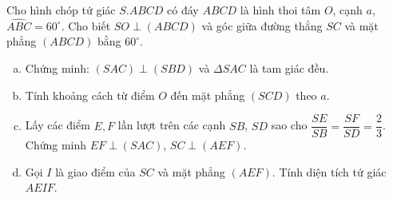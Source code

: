 \begin{bt}%
	Cho hình chóp tứ giác $S.ABCD$ có đáy $ABCD$ là hình thoi tâm $O$, cạnh $a$, $\widehat{ABC} = 60^{\circ}$. Cho biết $SO \perp (ABCD)$ và góc giữa đường thẳng $SC$ và mặt phẳng $(ABCD)$ bằng $60^{\circ}$.
	\begin{enumerate}[a)]
		\item Chứng minh: $(SAC) \perp (SBD)$ và $\Delta SAC$ là tam giác đều.
		\item Tính khoảng cách từ điểm $O$ đến mặt phẳng $(SCD)$ theo $a$.
		\item Lấy các điểm $E,F$ lần lượt trên các cạnh $SB$, $SD$ sao cho $\dfrac{SE}{SB}=\dfrac{SF}{SD}=\dfrac{2}{3}$. Chứng minh $EF\perp (SAC)$, $SC \perp (AEF)$.
		\item Gọi $I$ là giao điểm của $SC$ và mặt phẳng $(AEF)$. Tính diện tích tứ giác $AEIF$.
	\end{enumerate}
\end{bt}
